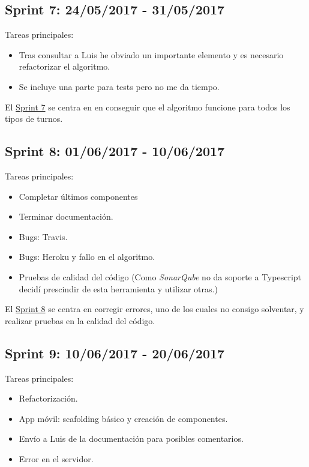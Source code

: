 \subsection{Sprint 7: 24/05/2017 - 31/05/2017}\label{sprint7}

Tareas principales:

\begin{itemize}

		\item Tras consultar a Luis he obviado un importante elemento y es necesario refactorizar el algoritmo.
	\item Se incluye una parte para tests pero no me da tiempo.
\end{itemize}


El \underline{Sprint 7} se centra en en conseguir que el algoritmo funcione para todos los tipos de turnos.

\subsection{Sprint 8: 01/06/2017 - 10/06/2017}\label{sprint8}

Tareas principales:

\begin{itemize}
	\item Completar últimos componentes
	\item Terminar documentación.
	\item Bugs: Travis. 
	\item Bugs: Heroku y fallo en el algoritmo.
	\item Pruebas de calidad del código (Como \emph{SonarQube} no da soporte a Typescript decidí prescindir de esta herramienta y utilizar otras.)
\end{itemize}


El \underline{Sprint 8} se centra en corregir errores, uno de los cuales no consigo solventar, y realizar pruebas en la calidad del código. 

\subsection{Sprint 9: 10/06/2017 - 20/06/2017}\label{sprint9}

Tareas principales:

\begin{itemize}
	\item Refactorización.
	\item App móvil: scafolding básico y creación de componentes.
	\item Envío a Luis de la documentación para posibles comentarios.
	\item Error en el servidor.
	
\end{itemize}

